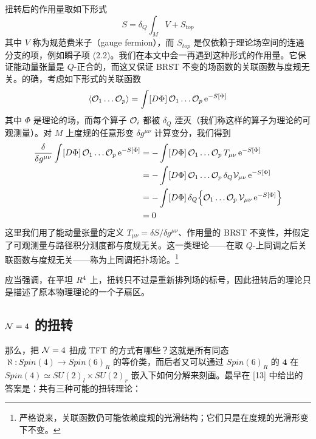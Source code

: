 扭转后的作用量取如下形式
\[ S = \delta_Q\int_M V + S_{top} \]
其中 $V$ 称为规范费米子（gauge fermion），而 $S_{top}$ 是仅依赖于理论场空间的连通分支的项，例如瞬子项 (2.2)。我们在本文中会一再遇到这种形式的作用量。它保证能动量张量是 $Q$-正合的，而这又保证 BRST 不变的场函数的关联函数与度规无关。的确，考虑如下形式的关联函数
\[ \langle\mathcal{O}_1\ldots\mathcal{O}_p\rangle = \int[D\Phi]\,\mathcal{O}_1\ldots\mathcal{O}_p\,\mathrm{e}^{-S[\Phi]} \]
其中 $\Phi$ 是理论的场，而每个算子 $\mathcal{O}_i$ 都被 $\delta_Q$ 湮灭（我们称这样的算子为理论的可观测量）。对 $M$ 上度规的任意形变 $\delta g^{\mu\nu}$ 计算变分，我们得到
\begin{align*}
\frac{\delta}{\delta g^{\mu\nu}}\int[D\Phi]\,\mathcal{O}_1\ldots\mathcal{O}_p\,\mathrm{e}^{-S[\Phi]}
&= -\int[D\Phi]\,\mathcal{O}_1\ldots\mathcal{O}_p\,T_{\mu\nu}\,\mathrm{e}^{-S[\Phi]} \\
&= -\int[D\Phi]\,\mathcal{O}_1\ldots\mathcal{O}_p\,\delta_Q\mathcal{V}_{\mu\nu}\,\mathrm{e}^{-S[\Phi]} \\
&= -\int[D\Phi]\,\delta_Q\Big\{\mathcal{O}_1\ldots\mathcal{O}_p\,\mathcal{V}_{\mu\nu}\,\mathrm{e}^{-S[\Phi]}\Big\} \\
&= 0
\end{align*}
这里我们用了能动量张量的定义 $T_{\mu\nu}=\delta S/\delta g^{\mu\nu}$、作用量的 BRST 不变性，并假定了可观测量与路径积分测度都与度规无关。这一类理论——在取 $Q$-上同调之后关联函数与度规无关——称为上同调拓扑场论。\footnote{严格说来，关联函数仍可能依赖度规的光滑结构；它们只是在度规的光滑形变下不变。}


应当强调，在平坦 $R^4$ 上，扭转只不过是重新排列场的标号，因此扭转后的理论只是描述了原本物理理论的一个子扇区。

\subsection{\texorpdfstring{$\mathcal{N}=4$ 的扭转}{N=4 的扭转}}

那么，把 $\mathcal{N}=4$ 扭成 TFT 的方式有哪些？这就是所有同态 $\aleph:Spin(4)\to Spin(6)_R$ 的等价类，而后者又可以通过 $Spin(6)_R$ 的 $\mathbf{4}$ 在 $Spin(4)\simeq SU(2)_l\times SU(2)_r$ 嵌入下如何分解来刻画。最早在 [13] 中给出的答案是：共有三种可能的扭转理论：

